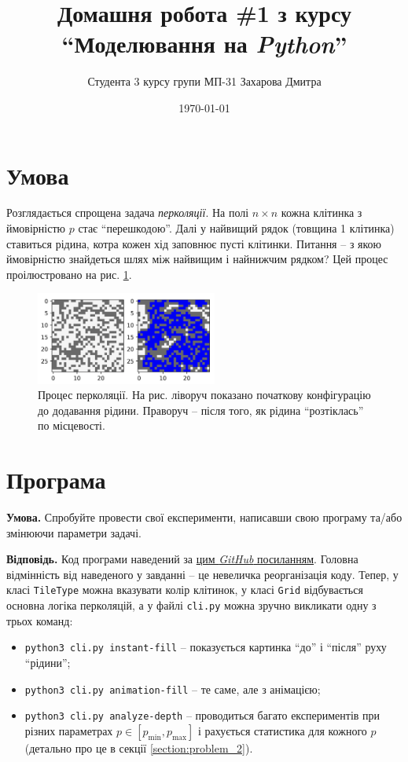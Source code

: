 \documentclass[14pt]{extarticle}
\title{Домашня робота \#1 з курсу ``Моделювання на \textit{Python}''}
\author{Студента 3 курсу групи МП-31 Захарова Дмитра}
\date{\today}
\begin{document}
\maketitle

\section*{Умова}

Розглядається спрощена задача \textit{перколяції}. На полі $n\times n$ кожна клітинка з ймовірністю $p$ стає ``перешкодою''. Далі у найвищий рядок (товщина 1 клітинка) ставиться рідина, котра кожен хід заповнює пусті клітинки. Питання -- з якою ймовірністю знайдеться шлях між найвищим і найнижчим рядком? Цей процес проілюстровано на рис. \ref{fig:percolation}.

\begin{figure}
    \centering
    \includegraphics[width=0.53\textwidth]{images/hw_1/illustration.png}
    \caption{Процес перколяції. На рис. ліворуч показано початкову конфігурацію до додавання рідини. Праворуч -- після того, як рідина ``розтіклась'' по місцевості.}
    \label{fig:percolation}
\end{figure}

\section{Програма}

\textbf{Умова.} Спробуйте провести свої експерименти, написавши свою програму та/або змінюючи параметри задачі.

\textbf{Відповідь.} Код програми наведений за \href{https://github.com/ZamDimon/University-Homeworks/tree/main/Term%206/Modelling%20in%20Python/code/homework_1}{цим \textit{GitHub} посиланням}. Головна відмінність від наведеного у завданні -- це невеличка реорганізація коду. Тепер, у класі \texttt{TileType} можна вказувати колір клітинок, у класі \texttt{Grid} відбувається основна логіка перколяцій, а у файлі \texttt{cli.py} можна зручно викликати одну з трьох команд:
\begin{itemize}
    \item \texttt{python3 cli.py instant-fill} -- показується картинка ``до'' і ``після'' руху ``рідини'';
    \item \texttt{python3 cli.py animation-fill} -- те саме, але з анімацією;
    \item \texttt{python3 cli.py analyze-depth} -- проводиться багато експериментів при різних параметрах $p \in [p_{\min},p_{\max}]$ і рахується статистика для кожного $p$ (детально про це в секції \ref{section:problem_2}).
\end{itemize}
\end{document}
